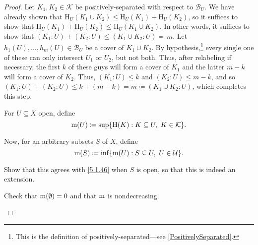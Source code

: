 \begin{thm}
\begin{savenotes}
\begin{proof}
Let $K_1,K_2\in \mathcal{K}$ be positively-separated with respect to $\mathcal{B}_U$.  We have already shown that $\mathrm{H}_U(K_1\cup K_2)\leq \mathrm{H}_U(K_1)+\mathrm{H}_U(K_2)$, so it suffices to show that $\mathrm{H}_U(K_1)+\mathrm{H}_U(K_2)\leq \mathrm{H}_U(K_1\cup K_2)$.  In other words, it suffices to show that $(K_1:U)+(K_2:U)\leq (K_1\cup K_2:U)\eqqcolon m$.  Let $h_1(U),\ldots ,h_m(U)\in \mathcal{B}_U$ be a cover of $K_1\cup K_2$.  By hypothesis,\footnote{This is the definition of positively-separated---see \cref{PositivelySeparated}.} every single one of these can only intersect $U_1$ or $U_2$, but not both.  Thus, after relabeling if necessary, the first $k$ of these guys will form a cover of $K_1$ and the latter $m-k$ will form a cover of $K_2$.  Thus, $(K_1:U)\leq k$ and $(K_2:U)\leq m-k$, and so $(K_1:U)+(K_2:U)\leq k+(m-k)=m\coloneqq (K_1\cup K_2:U)$, which completes this step.

For $U\subseteq X$ open, define
\begin{equation}\label{5.1.46}
\mathrm{m} (U)\coloneqq \sup \{ \mathrm{H}(K):K\subseteq U,\ K\in \mathcal{K}\} .
\end{equation}

Now, for an arbitrary subsets $S$ of $X$, define
\begin{equation}
\mathrm{m} (S)\coloneqq \inf \{ \mathrm{m} (U):S\subseteq U,\ U\in \mathcal{U}\} .
\end{equation}
\begin{exr}
Show that this agrees with \eqref{5.1.46} when $S$ is open, so that this is indeed an extension.
\end{exr}

\begin{exr}
Check that $\mathrm{m} (\emptyset )=0$ and that $\mathrm{m}$ is nondecreasing.
\end{exr}


\end{proof}
\end{savenotes}
\end{thm}
